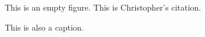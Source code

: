 \begin{figure}
This is an empty figure. This is Christopher's citation\autocite{PhysRevLett.112.103203}.
\caption[That]{This is also a caption.}
\end{figure}